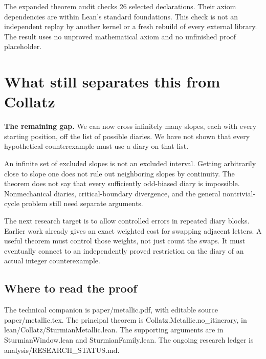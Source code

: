 \documentclass[11pt]{article}
\newcommand{\code}[1]{{\small\ttfamily #1}}
\begin{document}
The expanded theorem audit checks 26 selected declarations. Their axiom
dependencies are within Lean's standard foundations. This check is not
an independent replay by another kernel or a fresh rebuild of every
external library. The result uses no unproved mathematical axiom and no
unfinished proof placeholder.

\section{What still separates this from Collatz}
\begin{keyidea}
\textbf{The remaining gap.} We can now cross infinitely many slopes,
each with every starting position, off the list of possible diaries.
We have not shown that every hypothetical counterexample must use a
diary on that list.
\end{keyidea}
An infinite set of excluded slopes is not an excluded interval. Getting
arbitrarily close to slope one does not rule out neighboring slopes by
continuity. The theorem does not say that every sufficiently odd-biased
diary is impossible. Nonmechanical diaries, critical-boundary divergence,
and the general nontrivial-cycle problem still need separate arguments.

The next research target is to allow controlled errors in repeated diary
blocks. Earlier work already gives an exact weighted cost for swapping
adjacent letters. A useful theorem must control those weights, not just
count the swaps. It must eventually connect to an independently proved
restriction on the diary of an actual integer counterexample.

\subsection*{Where to read the proof}
The technical companion is \code{paper/metallic.pdf}, with editable
source \code{paper/metallic.tex}. The principal theorem is
\code{Collatz.Metallic.no\_\allowbreak{}itinerary}, in
\code{lean/Collatz/SturmianMetallic.lean}. The supporting arguments are in
\code{SturmianWindow.lean} and
\code{SturmianFamily.lean}. The ongoing research ledger is
\code{analysis/RESEARCH\_\allowbreak{}STATUS.md}.
\end{document}
